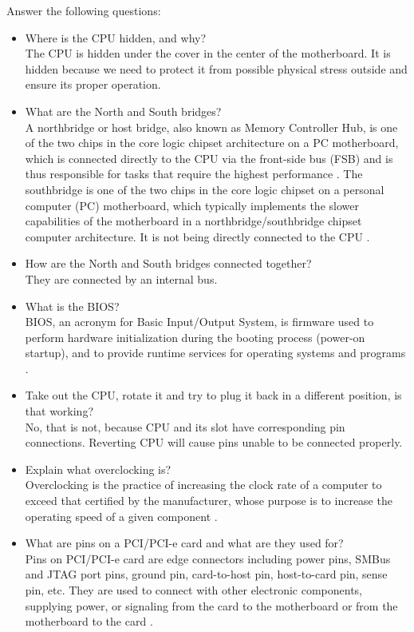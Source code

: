 \documentclass[a4paper]{article}
\begin{document}
Answer the following questions:
\begin{itemize}
    \item Where is the CPU hidden, and why?\\The CPU is hidden under the cover in the center of the motherboard. It is hidden because we need to protect it from possible physical stress outside and ensure its proper operation.
    \item What are the North and South bridges?\\A northbridge or host bridge, also known as Memory Controller Hub, is one of the two chips in the core logic chipset architecture on a PC motherboard, which is connected directly to the CPU via the front-side bus (FSB) and is thus responsible for tasks that require the highest performance \cite{northbridge}. The southbridge is one of the two chips in the core logic chipset on a personal computer (PC) motherboard, which typically implements the slower capabilities of the motherboard in a northbridge/southbridge chipset computer architecture. It is not being directly connected to the CPU \cite{southbridge}.
    \item How are the North and South bridges connected together?\\They are connected by an internal bus.
    \item What is the BIOS?\\BIOS, an acronym for Basic Input/Output System, is firmware used to perform hardware initialization during the booting process (power-on startup), and to provide runtime services for operating systems and programs \cite{bios}.
    \item Take out the CPU, rotate it and try to plug it back in a different position, is that working?\\No, that is not, because CPU and its slot have corresponding pin connections. Reverting CPU will cause pins unable to be connected properly.
    \item Explain what overclocking is?\\Overclocking is the practice of increasing the clock rate of a computer to exceed that certified by the manufacturer, whose purpose is to increase the operating speed of a given component \cite{overclocking}.
    \item What are pins on a PCI/PCI-e card and what are they used for?\\Pins on PCI/PCI-e card are edge connectors including power pins, SMBus and JTAG port pins, ground pin, card-to-host pin, host-to-card pin, sense pin, etc. They are used to connect with other electronic components, supplying power, or signaling from the card to the motherboard or from the motherboard to the card \cite{pcie}.

\end{itemize}
\end{document}
